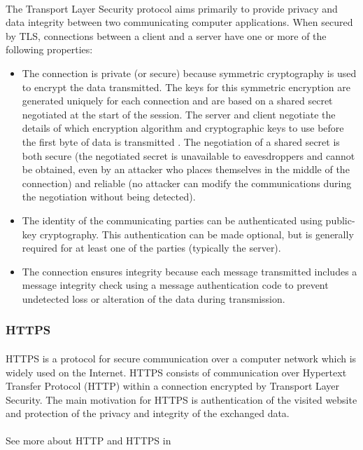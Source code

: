 \paragraph{}
The Transport Layer Security protocol aims primarily to provide privacy and data integrity between two communicating computer applications. When secured by TLS, connections between a client  and a server have one or more of the following properties:
\begin{itemize}
\item The connection is private (or secure) because symmetric cryptography is used to encrypt the data transmitted. The keys for this symmetric encryption are generated uniquely for each connection and are based on a shared secret negotiated at the start of the session. The server and client negotiate the details of which encryption algorithm and cryptographic keys to use before the first byte of data is transmitted . The negotiation of a shared secret is both secure (the negotiated secret is unavailable to eavesdroppers and cannot be obtained, even by an attacker who places themselves in the middle of the connection) and reliable (no attacker can modify the communications during the negotiation without being detected).
\item The identity of the communicating parties can be authenticated using public-key cryptography. This authentication can be made optional, but is generally required for at least one of the parties (typically the server).
\item The connection ensures integrity because each message transmitted includes a message integrity check using a message authentication code to prevent undetected loss or alteration of the data during transmission.
\end{itemize}

\subsubsection{HTTPS}
\paragraph{}
HTTPS is a protocol for secure communication over a computer network which is widely used on the Internet. HTTPS consists of communication over Hypertext Transfer Protocol (HTTP) within a connection encrypted by Transport Layer Security. The main motivation for HTTPS is authentication of the visited website and protection of the privacy and integrity of the exchanged data.
\paragraph{}
See more about HTTP and HTTPS in \cite{HTTPS}


